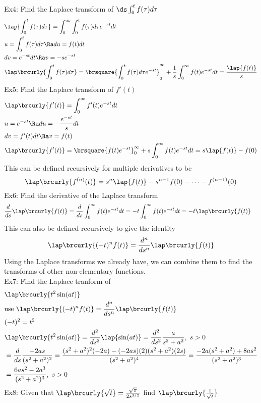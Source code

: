 Ex4: Find the Laplace transform of $\ds\int_0^t f(\tau)d\tau$
\begin{align*}
    &\lap\{\int_0^t f(\tau)d\tau\}=\int_0^\infty\int_0^t f(\tau)d\tau e^{-st}dt\\
    &u=\int_0^t f(\tau)d\tau\Ra du=f(t)dt\\
    &dv=e^{-st}dt\Ra v=-se^{-st}\\
    &\lap\brcurly{\int_0^t f(\tau)d\tau}=\brsquare{\int_0^t f(\tau)d\tau e^{-st}}_0^\infty+\frac{1}{s}\int_0^\infty f(t)e^{-st}dt=\frac{\lap{f(t)}}{s}
\end{align*}
Ex5: Find the Laplace transform of $f'(t)$
\begin{align*}
    &\lap\brcurly{f'(t)}=\int_0^\infty f'(t)e^{-st}dt\\
    &u=e^{-st}\Ra du=-\frac{e^{-st}}{s}dt\\
    &dv=f'(t)dt\Ra v=f(t)\\
    &\lap\brcurly{f'(t)}=\brsquare{f(t)e^{-st}}_0^\infty+s\int_0^\infty f(t)e^{-st}dt=s\lap{f(t)}-f(0)
\end{align*}
This can be defined recursively for multiple derivatives to be
$$\lap\brcurly{f^{(n)}(t)}=s^n\lap{f(t)}-s^{n-1}f(0)-\cdots-f^{(n-1)}(0)$$
Ex6: Find the derivative of the Laplace transform
\begin{align*}
    &\frac{d}{ds}\lap\brcurly{f(t)}=\frac{d}{ds}\int_0^\infty f(t)e^{-st}dt=-t\int_0^{\infty}f(t)e^{-st}dt=-t\lap\brcurly{f(t)}
\end{align*}
This can also be defined recursively to give the identity
$$\lap\brcurly{(-t)^nf(t)}=\frac{d^n}{ds^n}\lap\brcurly{f(t)}$$
Using the Laplace transforms we already have, we can combine them to find the transforms of other non-elementary functions.\\
Ex7: Find the Laplace tranform of 
\begin{align*}
    &\lap\brcurly{t^2\sin(at)}\\
    &\text{use }\lap\brcurly{(-t)^nf(t)}=\frac{d^n}{ds^n}\lap\brcurly{f(t)}\\
    &(-t)^2=t^2\\
    &\lap\brcurly{t^2\sin(at)}=\frac{d^2}{ds^2}\lap{\sin(at)}=\frac{d^2}{ds^2}\frac{a}{s^2+a^2},\ s>0\\
    &=\frac{d}{ds}\frac{-2as}{(s^2+a^2)^2}=\frac{(s^2+a^2)^2(-2a)-(-2as)(2)(s^2+a^2)(2s)}{(s^2+a^2)^4}=\frac{-2a(s^2+a^2)+8as^2}{(s^2+a^2)^3}\\
    &=\frac{6as^2-2a^3}{(s^2+a^2)^3},\ s>0
\end{align*}
Ex8: Given that $\lap\brcurly{\sqrt{t}}=\frac{\sqrt{\pi}}{2s^{3/2}}$ find $\lap\brcurly{\frac{1}{\sqrt{t}}}$

